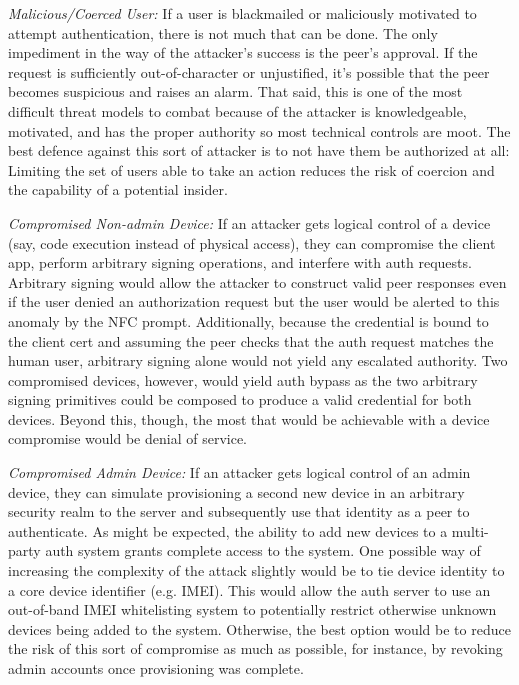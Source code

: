 \documentclass[letterpaper, 10 pt, conference]{ieeeconf}
\begin{document}
  \emph{Malicious/Coerced User:} If a user is blackmailed or maliciously motivated to attempt authentication, there is not much that can be done.
  The only impediment in the way of the attacker's success is the peer's approval.
  If the request is sufficiently out-of-character or unjustified, it's possible that the peer becomes suspicious and raises an alarm.
  That said, this is one of the most difficult threat models to combat because of the attacker is knowledgeable, motivated, and has the proper authority so most technical controls are moot.
  The best defence against this sort of attacker is to not have them be authorized at all: Limiting the set of users able to take an action reduces the risk of coercion and the capability of a potential insider.

  \emph{Compromised Non-admin Device:} If an attacker gets logical control of a device (say, code execution instead of physical access), they can compromise the client app, perform arbitrary signing operations, and interfere with auth requests.
  Arbitrary signing would allow the attacker to construct valid peer responses even if the user denied an authorization request but the user would be alerted to this anomaly by the NFC prompt.
  Additionally, because the credential is bound to the client cert and assuming the peer checks that the auth request matches the human user, arbitrary signing alone would not yield any escalated authority.
  Two compromised devices, however, would yield auth bypass as the two arbitrary signing primitives could be composed to produce a valid credential for both devices.
  Beyond this, though, the most that would be achievable with a device compromise would be denial of service.

  \emph{Compromised Admin Device:} If an attacker gets logical control of an admin device, they can simulate provisioning a second new device in an arbitrary security realm to the server and subsequently use that identity as a peer to authenticate.
  As might be expected, the ability to add new devices to a multi-party auth system grants complete access to the system.
  One possible way of increasing the complexity of the attack slightly would be to tie device identity to a core device identifier (e.g. IMEI).
  This would allow the auth server to use an out-of-band IMEI whitelisting system to potentially restrict otherwise unknown devices being added to the system.
  Otherwise, the best option would be to reduce the risk of this sort of compromise as much as possible, for instance, by revoking admin accounts once provisioning was complete.
\end{document}
